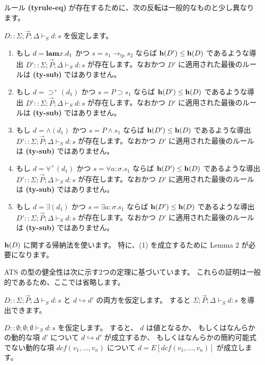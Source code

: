 \documentclass[submit,techreq,noauthor,onecolumn]{ipsj}
\begin{document}
ルール {\bf (tyrule-eq)} が存在するために、次の反転は一般的なものと少し異なります。

$D::\Sigma; \vec{P}; \Delta \vdash_S d:s$ を仮定します。

\begin{enumerate}
  \item もし $d = {\bf lam} x.d_1$ かつ $s = s_1 \rightarrow_{tp} s_2$ ならば ${\bf h}(D') \leq {\bf h}(D)$ であるような導出 $D'::\Sigma; \vec{P}; \Delta \vdash_S d:s$ が存在します。なおかつ $D'$ に適用された最後のルールは {\bf (ty-sub)} ではありません。
  \item もし $d = \supset^+(d_1)$ かつ $s = P \supset s_1$ ならば ${\bf h}(D') \leq {\bf h}(D)$ であるような導出 $D' :: \Sigma; \vec{P}; \Delta \vdash_S d:s$ が存在します。なおかつ $D'$ に適用された最後のルールは {\bf (ty-sub)} ではありません。
  \item もし $d = \wedge(d_1)$ かつ $s = P \wedge s_1$ ならば ${\bf h}(D') \leq {\bf h}(D)$ であるような導出 $D' :: \Sigma; \vec{P}; \Delta \vdash_S d:s$ が存在します。なおかつ $D'$ に適用された最後のルールは {\bf (ty-sub)} ではありません。
  \item もし $d = \forall^+(d_1)$ かつ $s = \forall a:\sigma.s_1$ ならば ${\bf h}(D') \leq {\bf h}(D)$ であるような導出 $D' :: \Sigma; \vec{P}; \Delta \vdash_S d:s$ が存在します。なおかつ $D'$ に適用された最後のルールは {\bf (ty-sub)} ではありません。
  \item もし $d = \exists(d_1)$ かつ $s = \exists a:\sigma.s_1$ ならば ${\bf h}(D') \leq {\bf h}(D)$ であるような導出 $D' :: \Sigma; \vec{P}; \Delta \vdash_S d:s$ が存在します。なおかつ $D'$ に適用された最後のルールは {\bf (ty-sub)} ではありません。
\end{enumerate}

${\bf h}(D)$ に関する帰納法を使います。
特に、(1) を成立するために Lemma 2 が必要になります。

ATS の型の健全性は次に示す2つの定理に基づいています。
これらの証明は一般的であるため、ここでは省略します。

$D :: \Sigma; \vec{P}; \Delta \vdash_S d:s$ と $d \hookrightarrow d'$ の両方を仮定します。
すると $\Sigma; \vec{P}; \Delta \vdash_S d:s$ を導出できます。

$D :: \emptyset;\emptyset;\emptyset \vdash_S d:s$ を仮定します。
すると、 $d$ は値となるか、
もしくはなんらかの動的な項 $d'$ について $d \hookrightarrow d'$ が成立するか、
もしくはなんらかの簡約可能式でない動的な項 $dcf(v_1,\ldots,v_n)$ について $d = E[dcf(v_1,\ldots,v_n)]$ が成立します。
\end{document}
